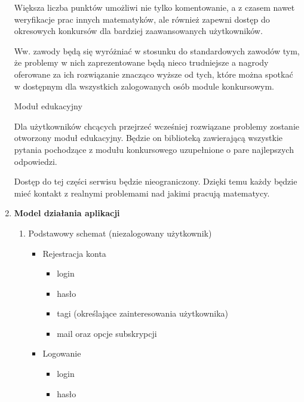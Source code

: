 \documentclass{article}
\newenvironment{nscenter}
 {\parskip=0pt\par\nopagebreak\centering}
 {\par\noindent\ignorespacesafterend}
\begin{document}
\begin{enumerate}
Większa liczba punktów umożliwi nie tylko komentowanie, a z czasem nawet weryfikacje prac innych matematyków,
ale również zapewni dostęp do okresowych konkursów dla bardziej zaawansowanych użytkowników.

Ww. zawody będą się wyróżniać w stosunku do standardowych zawodów tym,
że problemy w nich zaprezentowane będą nieco trudniejsze a nagrody oferowane za ich rozwiązanie znacząco wyższe od tych,
które można spotkać w dostępnym dla wszystkich zalogowanych osób module konkursowym.\\
\hrulefill
\begin{nscenter}
Moduł edukacyjny
\end{nscenter}
\newline
Dla użytkowników chcących przejrzeć wcześniej rozwiązane problemy zostanie otworzony moduł edukacyjny.
Będzie on biblioteką zawierającą wszystkie pytania pochodzące z modułu konkursowego uzupełnione o pare najlepszych odpowiedzi. 

Dostęp do tej części serwisu będzie nieograniczony. Dzięki temu każdy będzie mieć kontakt z realnymi problemami nad jakimi pracują matematycy.

\newpage
   \item \textbf{Model działania aplikacji}
    \begin{enumerate}
     \item Podstawowy schemat (niezalogowany użytkownik)
      \begin{itemize}
       \item Rejestracja konta
       \begin{itemize}
        \item login
        \item hasło
        \item tagi (określające zainteresowania użytkownika)
        \item mail oraz opcje subskrypcji
       \end{itemize}
       \item Logowanie
       \begin{itemize}
        \item login
        \item hasło
       \end{itemize}


\end{itemize}
\end{enumerate}
\end{enumerate}
\end{document}
